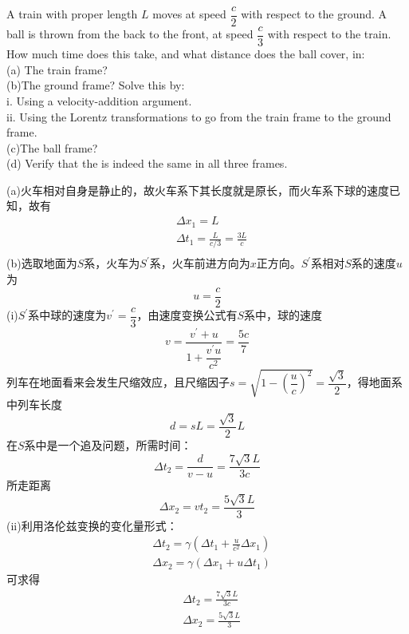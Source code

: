 \begin{solution}
	
		A train with proper length $L$ moves at speed $\dfrac{c}{2}$ with respect to the ground. A ball is thrown from the back to the front, at speed $\dfrac{c}{3}$ with respect to the train. How much time does this take, and what distance does the ball cover, in:
		\\(a) The train frame?
		\\(b)The ground frame? Solve this by:
		\\\hspace*{2em}i. Using a velocity-addition argument.
		\\\hspace*{2em}ii. Using the Lorentz transformations to go from the train
		frame to the ground frame.
		\\(c)The ball frame?
		\\(d) Verify that the  is indeed the same in all three
		frames.
		
		\tcbrule
		
        (a)火车相对自身是静止的，故火车系下其长度就是原长，而火车系下球的速度已知，故有
        \begin{equation*}
        	\begin{aligned}
        		&\Delta x_{1}=L\\
        		&\Delta t_{1}=\frac{L}{c/3}=\frac{3L}{c} \\
        	\end{aligned}
        \end{equation*}
        (b)选取地面为$S$系，火车为$S^{\prime}$系，火车前进方向为$x$正方向。$S^{\prime}$系相对$S$系的速度$u$为
        \[u=\dfrac{c}{2}\]
        (i)$S^{\prime}$系中球的速度为$v^{\prime}=\dfrac{c}{3}$，由速度变换公式有$S$系中，球的速度
        \[v=\dfrac{v^{\prime}+u}{1+\dfrac{{v}^{\prime}u}{c^2}}=\frac{5c}{7}\]
        列车在地面看来会发生尺缩效应，且尺缩因子$s = \sqrt{1-\left(\dfrac{u}{c}\right)^{2}} = \dfrac{\sqrt{3}}{2}$，得地面系中列车长度
        \[ d=sL = \dfrac{\sqrt{3}}{2}L\]
        在$S$系中是一个追及问题，所需时间：
        \[\Delta t_2=\frac{d}{v-u}=\frac{7\sqrt{3}L}{3c}\]
        所走距离
        \[\Delta x_2=vt_{2}=\frac{5\sqrt{3}L}{3}\]
        (ii)利用洛伦兹变换的变化量形式：
        \begin{equation*}
        	\begin{aligned}
        		&\Delta t_2 = \gamma(\Delta t_1 + \frac{u} {c^{2}}\Delta x_1)\\
        		&\Delta x_2 = \gamma(\Delta x_1 + u\Delta t_1)
        	\end{aligned}
        \end{equation*}
        可求得
        \begin{equation*}
        	\begin{aligned}
        		&\Delta t_2=\frac{7\sqrt{3}L}{3c}\\[1ex]
        		&\Delta x_2=\frac{5\sqrt{3}L}{3}\\
        	\end{aligned}
        \end{equation*}
        

\end{solution}
